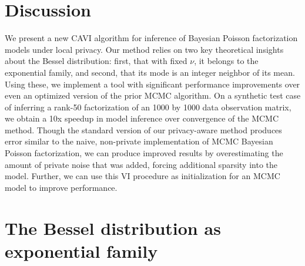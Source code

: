 \documentclass[letterpaper]{article}
\begin{document}
  \section{Discussion}
  We present a new CAVI algorithm for inference of Bayesian Poisson
  factorization models under local privacy. Our method relies on two key
  theoretical insights about the Bessel distribution: first, that with fixed
  $\nu$, it belongs to the exponential family, and second, that its mode is an
  integer neighbor of its mean. Using these, we implement a tool with
  significant performance improvements over even an optimized version of the
  prior MCMC algorithm. On a synthetic test case of inferring a rank-50
  factorization of an 1000 by 1000 data observation matrix, we obtain a 10x
  speedup in model inference over convergence of the MCMC method. Though the
  standard version of our privacy-aware method produces error similar to the
  naive, non-private implementation of MCMC Bayesian Poisson factorization, we
  can produce improved results by overestimating the amount of private noise
  that was added, forcing additional sparsity into the model. Further, we can
  use this VI procedure as initialization for an MCMC model to improve
  performance.
  
  
  
  
  \appendix
  
  \section{The Bessel distribution as exponential family}
  \label{sec:expfambessel}
  
\end{document}
